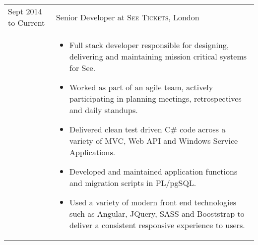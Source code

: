 \documentclass[a4paper,10pt]{article} %
\begin{document}
\begin{tabular}{ L{2cm} | L{11cm}}	



Sept 2014 to Current & Senior Developer at \textsc{See Tickets}, London \\

 
 

 
&\MPtrue	   
\begin{itemize}[leftmargin=*]
 
 
 
		\item Full stack developer responsible for designing, delivering and maintaining mission critical systems for See. 

		\item Worked as part of an agile team, actively participating in planning meetings, retrospectives and daily standups. 

		\item Delivered clean test driven C\# code across a variety of MVC, Web API and Windows Service Applications. 

		\item Developed and maintained application functions and migration scripts in PL/pgSQL.

		\item Used a variety of modern front end technologies such as Angular, JQuery, SASS and Booststrap to deliver a consistent responsive experience to users. 
		

	\end{itemize} \\
   

\end{tabular}
\end{document}

